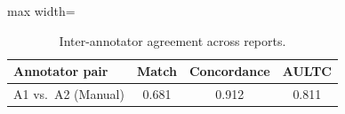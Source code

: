 \begin{table}[htbp]
\caption{Inter-annotator agreement across reports.}
\ChSixTableBodyStart
\begin{ChSixFloatBody}

\centering
\small


\begin{adjustbox}{max width=\columnwidth}
\begin{tabular}{lccc}
\toprule
Annotator pair & Match & Concordance & AULTC \\
\midrule
A1 vs.\ A2 (Manual) & 0.681 & 0.912 & 0.811 \\
\bottomrule
\end{tabular}
\end{adjustbox}

\end{ChSixFloatBody}
\end{table}